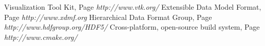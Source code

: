 \documentclass{article}
\begin{document}
  \begin{thebibliography}{1}
  
   Visualization Tool Kit, Page {\em http://www.vtk.org/}
   Extensible Data Model Format, Page {\em http://www.xdmf.org}
   Hierarchical Data Format Group, Page {\em http://www.hdfgroup.org/HDF5/}
   Cross-platform, open-source build system, Page {\em http://www.cmake.org/}
%
%
  \end{thebibliography}
\end{document}
